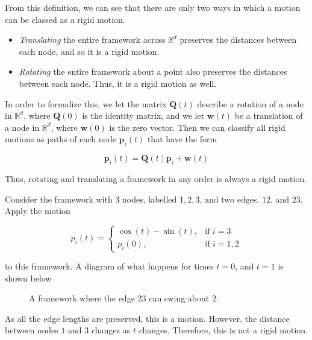 \begin{flushleft}
From this definition, we can see that there are only two ways in which a motion can be classed as a rigid motion.     
\end{flushleft}

\begin{itemize}
    \item \textit{Translating} the entire framework across $\mathbb{R}^d$ preserves the distances between each node, and so it is a rigid motion.
    \vspace{-3mm}
    \item \textit{Rotating} the entire framework about a point also preserves the distances between each node. Thus, it is a rigid motion as well.
    \vspace{-3mm}
\end{itemize}

\begin{flushleft}
In order to formalize this, we let the matrix $\mathbf{Q}(t)$ describe a rotation of a node in $\mathbb{R}^d$, where $\mathbf{Q}(0)$ is the identity matrix, and we let $\mathbf{w}(t)$ be a translation of a node in $\mathbb{R}^d$, where $\mathbf{w}(0)$ is the zero vector. Then we can classify all rigid motions as paths of each node $\mathbf{p}_i(t)$ that have the form 

\[
\mathbf{p}_i(t) = \mathbf{Q}(t)\mathbf{p}_i + \mathbf{w}(t)
\]

Thus, rotating and translating a framework in any order is always a rigid motion.
\end{flushleft}

\begin{example}
\label{eg: simple motion}
Consider the framework with 3 nodes, labelled $1,2,3$, and two edges, $12$, and $23$. Apply the motion 

\[ p_i(t) = 
\begin{cases}
    \cos(t) - \sin(t), & \text{if } i = 3 \\
    p_i(0), & \text{if } i = 1,2
\end{cases}
\]

\vspace{3 mm}
\noindent
to this framework. A diagram of what happens for times $t=0$, and $t=1$ is shown below

    \begin{figure}[htbp]
        \centering
        
        \caption{A framework where the edge $23$ can swing about $2$.}
        \label{fig: simple motion}
    \end{figure}
\vspace{-5 mm}
\begin{flushleft}
As all the edge lengths are preserved, this is a motion. However, the distance between nodes $1$ and $3$ changes as $t$ changes. Therefore, this is not a rigid motion.    
\end{flushleft}
\end{example}

